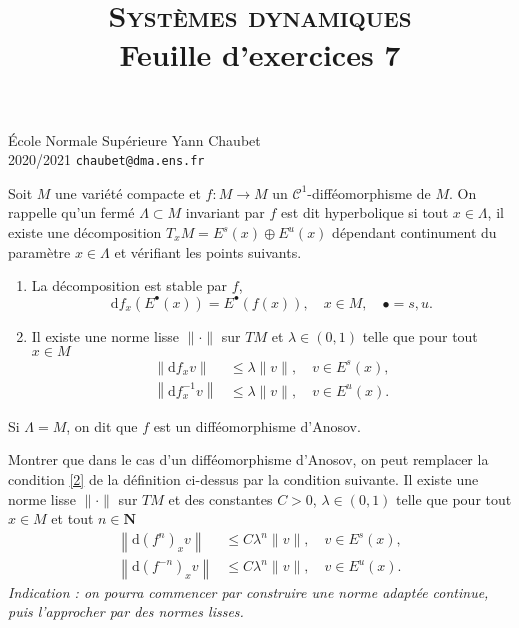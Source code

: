 \documentclass[a4paper,10pt,openany]{article}
\title{\textsc{Syst\`emes dynamiques} \\ Feuille d'exercices 7}
\date{}
\author{}
\theoremstyle{plain}
\theoremstyle{definition}
\newcommand{\dd}{\mathrm{d}}
\newcommand{\N}{\mathbf{N}}
\begin{document}
{\noindent \'Ecole Normale Sup\'erieure  \hfill Yann Chaubet } \\
{2020/2021 \hfill \texttt{chaubet@dma.ens.fr}}

{\let\newpage\relax\maketitle}
\maketitle

\noindent Soit $M$ une vari\'et\'e compacte et $f : M \to M$ un $\mathcal{C}^1$-diff\'eomorphisme de $M$. On rappelle qu'un ferm\'e $\Lambda \subset M$ invariant par $f$ est dit hyperbolique si tout $x \in \Lambda$, il existe une d\'ecomposition $T_xM = E^s(x) \oplus E^u(x)$ d\'ependant continument du param\`etre $x \in \Lambda$ et v\'erifiant les points suivants.

\begin{enumerate}
\item La d\'ecomposition est stable par $f$,
$$
\dd f_x(E^\bullet(x)) = E^\bullet(f(x)), \quad x \in M, \quad \bullet = s,u.
$$
\item \label{2} Il existe une norme lisse $\|\cdot\|$ sur $TM$ et $\lambda \in (0,1)$ telle que pour tout $x \in M$
$$
\begin{aligned}
\left \| \dd f_x v \right\| &\leq \lambda \| v \|, \quad v \in E^s(x), \\
\left \| \dd f^{-1}_x v \right\| &\leq \lambda \| v \|, \quad v \in E^u(x).
\end{aligned}
$$
\end{enumerate}
Si $\Lambda = M$, on dit que $f$ est un diff\'eomorphisme d'Anosov.

\vspace{0.6cm}

 \vspace{1.5mm} 

\noindent Montrer que dans le cas d'un diff\'eomorphisme d'Anosov, on peut remplacer la condition \ref{2} de la d\'efinition ci-dessus par la condition suivante. Il existe une norme lisse $\|\cdot\|$ sur $TM$ et des constantes $C > 0$, $\lambda \in (0,1)$ telle que pour tout $x \in M$ et tout $n \in \N$
$$
\begin{aligned}
\left \| \dd (f^n)_x v \right\| &\leq C \lambda^n \| v \|, \quad v \in E^s(x), \\
\left \| \dd (f^{-n})_x v \right\| &\leq C\lambda^n \| v \|, \quad v \in E^u(x).
\end{aligned}
$$
\textit{Indication : on pourra commencer par construire une norme adapt\'ee continue, puis l'approcher par des normes lisses.}
\vspace{0.6cm}
\end{document}
